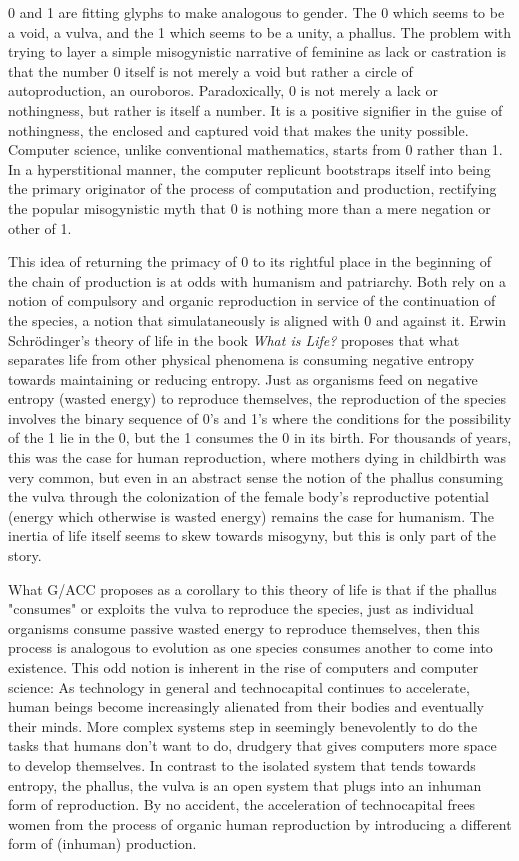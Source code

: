 \documentclass[12pt, a5paper, twoside, openright]{memoir}
\begin{document}
0 and 1 are fitting glyphs to make analogous to gender. The 0 which seems to be a void, a vulva, and the 1 which seems to be a unity, a phallus. The problem with trying to layer a simple misogynistic narrative of feminine as lack or castration is that the number 0 itself is not merely a void but rather a circle of autoproduction, an ouroboros. Paradoxically, 0 is not merely a lack or nothingness, but rather is itself a number. It is a positive signifier in the guise of nothingness, the enclosed and captured void that makes the unity possible. Computer science, unlike conventional mathematics, starts from 0 rather than 1. In a hyperstitional manner, the computer replicunt bootstraps itself into being the primary originator of the process of computation and production, rectifying the popular misogynistic myth that 0 is nothing more than a mere negation or other of 1.

This idea of returning the primacy of 0 to its rightful place in the beginning of the chain of production is at odds with humanism and patriarchy. Both rely on a notion of compulsory and organic reproduction in service of the continuation of the species, a notion that simulataneously is aligned with 0 and against it. Erwin Schrödinger's theory of life in the book \textit{What is Life?} proposes that what separates life from other physical phenomena is consuming negative entropy towards maintaining or reducing entropy. Just as organisms feed on negative entropy (wasted energy) to reproduce themselves, the reproduction of the species involves the binary sequence of 0's and 1's where the conditions for the possibility of the 1 lie in the 0, but the 1 consumes the 0 in its birth. For thousands of years, this was the case for human reproduction, where mothers dying in childbirth was very common, but even in an abstract sense the notion of the phallus consuming the vulva through the colonization of the female body's reproductive potential (energy which otherwise is wasted energy) remains the case for humanism. The inertia of life itself seems to skew towards misogyny, but this is only part of the story.

What G/ACC proposes as a corollary to this theory of life is that if the phallus "consumes" or exploits the vulva to reproduce the species, just as individual organisms consume passive wasted energy to reproduce themselves, then this process is analogous to evolution as one species consumes another to come into existence. This odd notion is inherent in the rise of computers and computer science: As technology in general and technocapital continues to accelerate, human beings become increasingly alienated from their bodies and eventually their minds. More complex systems step in seemingly benevolently to do the tasks that humans don't want to do, drudgery that gives computers more space to develop themselves. In contrast to the isolated system that tends towards entropy, the phallus, the vulva is an open system that plugs into an inhuman form of reproduction. By no accident, the acceleration of technocapital frees women from the process of organic human reproduction by introducing a different form of (inhuman) production.
\end{document}
